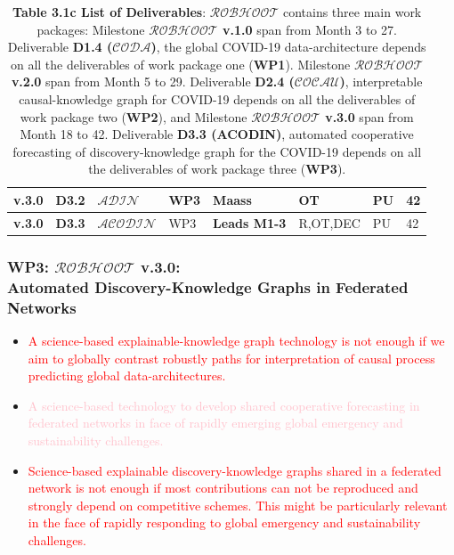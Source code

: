 \documentclass[11pt, a4paper]{article} %
\begin{document}
\begin{table}[h!]
\begin{center}
\begin{tabular}{|m{2cm} || m{1.25cm} || m{1.75cm} || m{1.55cm} || m{2.4cm} || m{1.7cm} || m{1.15cm} || m{1.7cm}|}
   \rowcolor{piggypink!80}
  {\bf v.3.0} & {\bf D3.2} & $\mathcal{ADIN}$ & WP3 & {\bf Maass} & OT & PU & 42 \\
  \hline\hline
  \rowcolor{piggypink!80}
  {\bf v.3.0} & {\bf D3.3} & $\mathcal{ACODIN}$ & WP3 & {\bf Leads M1-3} & R,OT,DEC & PU & 42 \\
\hline\hline
  \end{tabular}
\end{center}
\caption*{{{\bf Table 3.1c List of Deliverables}: {\bf $\mathcal{ROBHOOT}$}
    contains three main work packages: Milestone {\bf
      $\mathcal{ROBHOOT}$ v.1.0} span from Month 3 to 27. Deliverable
    {\bf D1.4 ($\mathcal{CODA}$)}, the global COVID-19
    data-architecture depends on all the deliverables of work package
    one ({\bf WP1}). Milestone {\bf $\mathcal{ROBHOOT}$ v.2.0} span
    from Month 5 to 29. Deliverable {\bf D2.4 ($\mathcal{COCAU}$)},
    interpretable causal-knowledge graph for COVID-19 depends on all
    the deliverables of work package two ({\bf WP2}), and Milestone
    {\bf $\mathcal{ROBHOOT}$ v.3.0} span from Month 18 to
    42. Deliverable {\bf D3.3 (ACODIN)}, automated cooperative
    forecasting of discovery-knowledge graph for the COVID-19 depends
    on all the deliverables of work package three ({\bf WP3}).}}
\end{table}

 
\subsubsection{{\bf WP3: $\mathcal{ROBHOOT}$ v.3.0}: \\ Automated
  Discovery-Knowledge Graphs in Federated Networks}

   \begin{itemize}
   \item \textcolor{red}{A science-based explainable-knowledge graph
       technology is not enough if we aim to globally contrast
       robustly paths for interpretation of causal process predicting
       global data-architectures.}
   \item \textcolor{pink}{A science-based technology to develop shared
       cooperative forecasting in federated networks in face of
       rapidly emerging global emergency and sustainability
       challenges.}
  \item \textcolor{red}{Science-based explainable discovery-knowledge
      graphs shared in a federated network is not enough if most
      contributions can not be reproduced and strongly depend on
      competitive schemes. This might be particularly relevant in the
      face of rapidly responding to global emergency and
      sustainability challenges.}
  \end{itemize}
\end{document}
